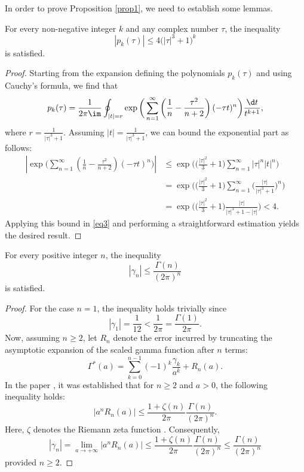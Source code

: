 In order to prove Proposition \ref{prop1}, we need to establish some lemmas.

\begin{Lemma}\label{lemma1} For every non-negative integer $k$ and any complex number $\tau$, the inequality
\[
\left| p_k (\tau )\right| \le 4 \bigl(\left| \tau \right|^3 + 1\bigr)^k
\]
is satisfied.
\end{Lemma}

\begin{proof}
Starting from the expansion defining the polynomials $p_k(\tau)$ and using Cauchy's formula, we find that
\begin{equation}\label{eq3}
p_k (\tau ) = \frac{1}{2\pi \im}\oint_{\left| t \right| = r} \exp \bigg( \sum_{n = 1}^\infty \left( \frac{1}{n} - \frac{\tau ^2 }{n + 2} \right)( - \tau t)^n \bigg)\frac{\d t}{t^{k + 1}} ,
\end{equation}
where $r = \frac{1}{\left| \tau \right|^3 + 1}$. Assuming $\left|t\right| = \frac{1}{\left| \tau \right|^3 + 1}$, we can bound the exponential part as follows:
\begin{align*}
\left| \exp \bigg( \sum_{n = 1}^\infty \left( \frac{1}{n} - \frac{\tau ^2}{n + 2} \right)( - \tau t)^n \bigg) \right| & \le \exp \bigg( \bigg( \frac{\left| \tau \right|^2 }{3} + 1 \bigg)\sum_{n = 1}^\infty \left| \tau \right|^n \left| t \right|^n \bigg) \\ & = \exp \bigg( \bigg( \frac{\left| \tau \right|^2 }{3} + 1 \bigg)\sum_{n = 1}^\infty \bigg( \frac{\left| \tau \right|}{\left| \tau \right|^3 + 1} \bigg)^n \bigg) \\ & = \exp \bigg( \bigg( \frac{\left| \tau \right|^2 }{3} + 1 \bigg)\frac{\left| \tau \right|}{\left| \tau \right|^3 + 1 - \left| \tau \right|} \bigg) <4.
\end{align*}
Applying this bound in \eqref{eq3} and performing a straightforward estimation yields the desired result.
\end{proof}

\begin{Lemma}\label{lemma2} For every positive integer $n$, the inequality
\[
\left|\gamma_n\right| \le \frac{\Gamma(n)}{(2\pi)^n}
\]
is satisfied.
\end{Lemma}

\begin{proof} For the case $n=1$, the inequality holds trivially since
\[
\left| \gamma _1 \right| = \frac{1}{12} < \frac{1}{2\pi} = \frac{\Gamma (1)}{2\pi}.
\]
Now, assuming $n\ge 2$, let $R_n$ denote the error incurred by truncating the asymptotic expansion of the scaled gamma function after $n$ terms:
\[
\Gamma^\ast (a)=\sum_{k = 0}^{n - 1} (-1)^k \frac{\gamma _k}{a^k} + R_n (a).
\]
In the paper \cite[equation~(3.11)]{Boyd1994}, it was established that for $n\ge 2$ and $a>0$, the following inequality holds:
\[
\left| a^n R_n (a) \right| \le \frac{1 + \zeta (n)}{2\pi }\frac{\Gamma (n)}{(2\pi )^n}.
\]
Here, $\zeta$ denotes the Riemann zeta function \cite[equation~(25.2.1)]{DLMF}. Consequently,
\[
\left| \gamma_n \right| = \lim_{a \to + \infty } \left| a^n R_n (a) \right| \le \frac{1 + \zeta (n)}{2\pi }\frac{\Gamma (n)}{(2\pi )^n} \le \frac{\Gamma (n)}{(2\pi )^n}
\]
provided $n\ge 2$.
\end{proof}

